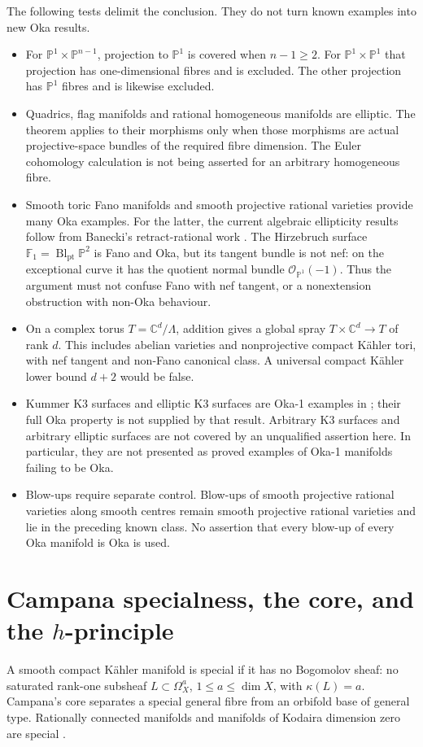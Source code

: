 \documentclass[12pt]{amsart}
\theoremstyle{definition}
\theoremstyle{remark}
\numberwithin{equation}{section}
\newcommand{\cO}{\mathcal{O}}
\newcommand{\C}{\mathbb{C}}
\newcommand{\mP}{\mathbb{P}}
\begin{document}
The following tests delimit the conclusion. They do not turn known examples into new Oka results.
\begin{itemize}
\item For $\mP^1\times\mP^{n-1}$, projection to $\mP^1$ is covered when $n-1\geq2$. For $\mP^1\times\mP^1$ that projection has one-dimensional fibres and is excluded. The other projection has $\mP^1$ fibres and is likewise excluded.
\item Quadrics, flag manifolds and rational homogeneous manifolds are elliptic. The theorem applies to their morphisms only when those morphisms are actual projective-space bundles of the required fibre dimension. The Euler cohomology calculation is not being asserted for an arbitrary homogeneous fibre.
\item Smooth toric Fano manifolds and smooth projective rational varieties provide many Oka examples. For the latter, the current algebraic ellipticity results follow from Banecki's retract-rational work \cite{en:Banecki}. The Hirzebruch surface $\mathbb F_1=\operatorname{Bl}_{\mathrm{pt}}\mP^2$ is Fano and Oka, but its tangent bundle is not nef: on the exceptional curve it has the quotient normal bundle $\cO_{\mP^1}(-1)$. Thus the argument must not confuse Fano with nef tangent, or a nonextension obstruction with non-Oka behaviour.
\item On a complex torus $T=\C^d/\Lambda$, addition gives a global spray $T\times\C^d\to T$ of rank $d$. This includes abelian varieties and nonprojective compact K\"ahler tori, with nef tangent and non-Fano canonical class. A universal compact K\"ahler lower bound $d+2$ would be false.
\item Kummer K3 surfaces and elliptic K3 surfaces are Oka-1 examples in \cite{en:AF}; their full Oka property is not supplied by that result. Arbitrary K3 surfaces and arbitrary elliptic surfaces are not covered by an unqualified assertion here. In particular, they are not presented as proved examples of Oka-1 manifolds failing to be Oka.
\item Blow-ups require separate control. Blow-ups of smooth projective rational varieties along smooth centres remain smooth projective rational varieties and lie in the preceding known class. No assertion that every blow-up of every Oka manifold is Oka is used.
\end{itemize}

\section{Campana specialness, the core, and the \texorpdfstring{$h$}{h}-principle}
A smooth compact K\"ahler manifold is special if it has no Bogomolov sheaf: no saturated rank-one subsheaf $L\subset\Omega_X^a$, $1\leq a\leq\dim X$, with $\kappa(L)=a$. Campana's core separates a special general fibre from an orbifold base of general type. Rationally connected manifolds and manifolds of Kodaira dimension zero are special \cite{en:Campana}.
\end{document}
